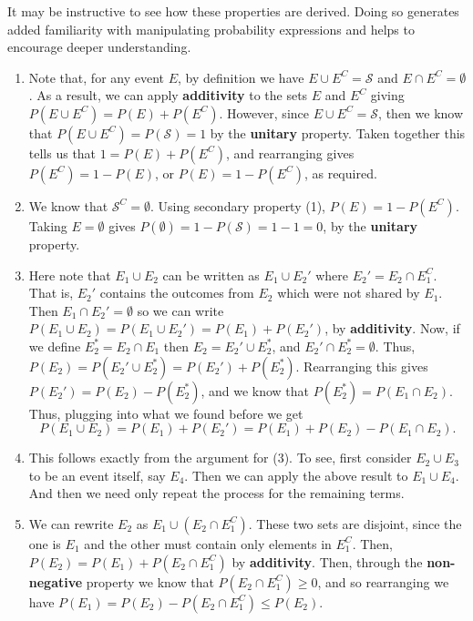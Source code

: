 \documentclass[
  letterpaper,
  DIV=11,
  numbers=noendperiod]{scrreprt}
\theoremstyle{definition}
\theoremstyle{definition}
\theoremstyle{definition}
\theoremstyle{remark}
\begin{document}
\begin{tcolorbox}[enhanced jigsaw, rightrule=.15mm, leftrule=.75mm, opacitybacktitle=0.6, title={Proofs of the Secondary Properties of Probability}, colframe=quarto-callout-warning-color-frame, opacityback=0, coltitle=black, breakable, toptitle=1mm, colbacktitle=quarto-callout-warning-color!10!white, bottomtitle=1mm, titlerule=0mm, arc=.35mm, colback=white, toprule=.15mm, left=2mm, bottomrule=.15mm]

It may be instructive to see how these properties are derived. Doing so
generates added familiarity with manipulating probability expressions
and helps to encourage deeper understanding.

\begin{enumerate}
\def\labelenumi{\arabic{enumi}.}
\item
  Note that, for any event \(E\), by definition we have
  \(E \cup E^C = \mathcal{S}\) and \(E \cap E^C = \emptyset\). As a
  result, we can apply \textbf{additivity} to the sets \(E\) and \(E^C\)
  giving \(P(E \cup E^C) = P(E) + P(E^C)\). However, since
  \(E\cup E^C = \mathcal{S}\), then we know that
  \(P(E \cup E^C) = P(\mathcal{S}) = 1\) by the \textbf{unitary}
  property. Taken together this tells us that \(1 = P(E) + P(E^C)\), and
  rearranging gives \(P(E^C) = 1 - P(E)\), or \(P(E) = 1 - P(E^C)\), as
  required.
\item
  We know that \(\mathcal{S}^C = \emptyset\). Using secondary property
  (1), \(P(E) = 1 - P(E^C)\). Taking \(E = \emptyset\) gives
  \(P(\emptyset) = 1 - P(\mathcal{S}) = 1 - 1 = 0\), by the
  \textbf{unitary} property.
\item
  Here note that \(E_1 \cup E_2\) can be written as \(E_1 \cup E_2'\)
  where \(E_2' = E_2\cap E_1^C\). That is, \(E_2'\) contains the
  outcomes from \(E_2\) which were not shared by \(E_1\). Then
  \(E_1 \cap E_2' = \emptyset\) so we can write
  \(P(E_1 \cup E_2) = P(E_1 \cup E_2') = P(E_1) + P(E_2')\), by
  \textbf{additivity}. Now, if we define \(E_2^* = E_2\cap E_1\) then
  \(E_2 = E_2' \cup E_2^*\), and \(E_2'\cap E_2^* = \emptyset\). Thus,
  \(P(E_2) = P(E_2'\cup E_2^*) = P(E_2') + P(E_2^*)\). Rearranging this
  gives \(P(E_2') = P(E_2) - P(E_2^*)\), and we know that
  \(P(E_2^*) = P(E_1 \cap E_2)\). Thus, plugging into what we found
  before we get
  \[P(E_1 \cup E_2) = P(E_1) + P(E_2') = P(E_1) + P(E_2) - P(E_1 \cap E_2).\]
\item
  This follows exactly from the argument for (3). To see, first consider
  \(E_2 \cup E_3\) to be an event itself, say \(E_4\). Then we can apply
  the above result to \(E_1 \cup E_4\). And then we need only repeat the
  process for the remaining terms.
\item
  We can rewrite \(E_2\) as \(E_1 \cup (E_2 \cap E_1^C)\). These two
  sets are disjoint, since the one is \(E_1\) and the other must contain
  only elements in \(E_1^C\). Then,
  \(P(E_2) = P(E_1) + P(E_2 \cap E_1^C)\) by \textbf{additivity}. Then,
  through the \textbf{non-negative} property we know that
  \(P(E_2 \cap E_1^C) \geq 0\), and so rearranging we have
  \(P(E_1) = P(E_2) - P(E_2\cap E_1^C) \leq P(E_2)\).
\end{enumerate}

\end{tcolorbox}
\end{document}
